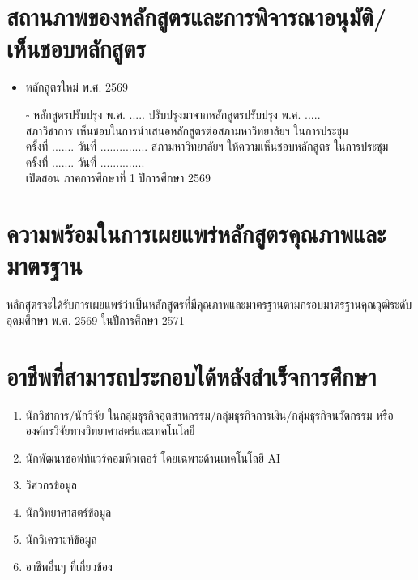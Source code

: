 \section{สถานภาพของหลักสูตรและการพิจารณาอนุมัติ/เห็นชอบหลักสูตร}
\begin{itemize}
	\item หลักสูตรใหม่ พ.ศ. 2569
	\item[$\square$] หลักสูตรปรับปรุง พ.ศ. .....  ปรับปรุงมาจากหลักสูตรปรับปรุง พ.ศ. .....\\
	สภาวิชาการ เห็นชอบในการนำเสนอหลักสูตรต่อสภามหาวิทยาลัยฯ ในการประชุม \\ ครั้งที่ ....... วันที่ ...............
	สภามหาวิทยาลัยฯ ให้ความเห็นชอบหลักสูตร ในการประชุม \\ ครั้งที่ ....... วันที่ .............. \\
	เปิดสอน ภาคการศึกษาที่ 1 ปีการศึกษา 2569
\end{itemize}
\section{ความพร้อมในการเผยแพร่หลักสูตรคุณภาพและมาตรฐาน}
	หลักสูตรจะได้รับการเผยแพร่ว่าเป็นหลักสูตรที่มีคุณภาพและมาตรฐานตามกรอบมาตรฐานคุณวุฒิระดับอุดมศึกษา พ.ศ. 2569 ในปีการศึกษา 2571
\section{อาชีพที่สามารถประกอบได้หลังสำเร็จการศึกษา}
\begin{enumerate}
	\item นักวิชาการ/นักวิจัย ในกลุ่มธุรกิจอุตสาหกรรม/กลุ่มธุรกิจการเงิน/กลุ่มธุรกิจนวัตกรรม หรือองค์กรวิจัยทางวิทยาศาสตร์และเทคโนโลยี
	\item นักพัฒนาซอฟท์แวร์คอมพิวเตอร์ โดยเฉพาะด้านเทคโนโลยี AI
	\item วิศวกรข้อมูล 
	\item นักวิทยาศาสตร์ข้อมูล
	\item นักวิเคราะห์ข้อมูล 
	\item อาชีพอื่นๆ ที่เกี่ยวข้อง
\end{enumerate}

